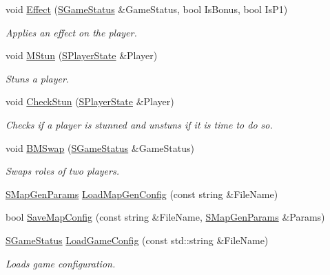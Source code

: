 \begin{DoxyCompactItemize}
void \hyperlink{namespace_chase_game_a071f5577018cd55d56097edb64ecb000}{Effect} (\hyperlink{struct_chase_game_1_1_s_game_status}{S\-Game\-Status} \&Game\-Status, bool Is\-Bonus, bool Is\-P1)
\begin{DoxyCompactList}\small\item\em Applies an effect on the player. \end{DoxyCompactList}\item 
void \hyperlink{namespace_chase_game_a70ca6da7191ff141165490765f974df2}{M\-Stun} (\hyperlink{struct_chase_game_1_1_s_player_state}{S\-Player\-State} \&Player)
\begin{DoxyCompactList}\small\item\em Stuns a player. \end{DoxyCompactList}\item 
void \hyperlink{namespace_chase_game_af0e06dea9207296017b37bf8bcb0224b}{Check\-Stun} (\hyperlink{struct_chase_game_1_1_s_player_state}{S\-Player\-State} \&Player)
\begin{DoxyCompactList}\small\item\em Checks if a player is stunned and unstuns if it is time to do so. \end{DoxyCompactList}\item 
void \hyperlink{namespace_chase_game_a27ec3d5c04abe9fcf9d059030bd27656}{B\-M\-Swap} (\hyperlink{struct_chase_game_1_1_s_game_status}{S\-Game\-Status} \&Game\-Status)
\begin{DoxyCompactList}\small\item\em Swaps roles of two players. \end{DoxyCompactList}\item 
\hyperlink{struct_chase_game_1_1_s_map_gen_params}{S\-Map\-Gen\-Params} \hyperlink{namespace_chase_game_a4779af792d3de8e274049bf2019e0343}{Load\-Map\-Gen\-Config} (const string \&File\-Name)
\item 
bool \hyperlink{namespace_chase_game_a98e8d90127c802c1445266e39966c3fb}{Save\-Map\-Config} (const string \&File\-Name, \hyperlink{struct_chase_game_1_1_s_map_gen_params}{S\-Map\-Gen\-Params} \&Params)
\item 
\hyperlink{struct_chase_game_1_1_s_game_status}{S\-Game\-Status} \hyperlink{namespace_chase_game_addd460052ec5a5fe3010665ca84b07ec}{Load\-Game\-Config} (const std\-::string \&File\-Name)
\begin{DoxyCompactList}\small\item\em Loads game configuration. \end{DoxyCompactList}\item 

\end{DoxyCompactItemize}
